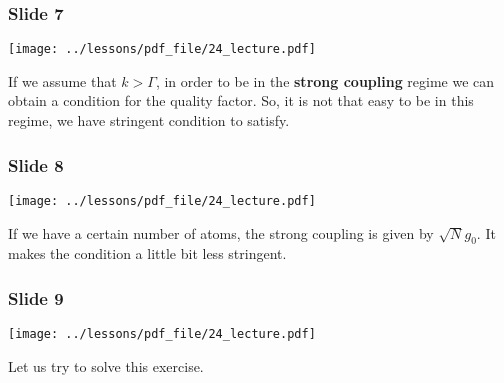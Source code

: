 \documentclass[../main/main.tex]{subfiles}
\begin{document}
\newpage

\subsubsection*{Slide 7}

\begin{minipage}[]{0.5\linewidth}
\centering
\texttt{[image: ../lessons/pdf\_file/24\_lecture.pdf]}
\end{minipage}
\hspace{0.3cm}\vspace{0.3cm}
\begin{minipage}[c]{0.47\linewidth}

If we assume that \( k > \Gamma  \), in order to be in the \textbf{strong coupling} regime we can obtain a condition for the quality factor. So, it is not that easy to be in this regime, we have stringent condition to satisfy.

\end{minipage}

\subsubsection*{Slide 8}

\begin{minipage}[]{0.5\linewidth}
\centering
\texttt{[image: ../lessons/pdf\_file/24\_lecture.pdf]}
\end{minipage}
\hspace{0.3cm}\vspace{0.3cm}
\begin{minipage}[c]{0.47\linewidth}

If we have a certain number of atoms, the strong coupling is given by \( \sqrt{N} g_0  \). It makes the condition a little bit less stringent.

\end{minipage}

\subsubsection*{Slide 9}

\begin{minipage}[]{0.5\linewidth}
\centering
\texttt{[image: ../lessons/pdf\_file/24\_lecture.pdf]}
\end{minipage}
\hspace{0.3cm}\vspace{0.3cm}
\begin{minipage}[c]{0.47\linewidth}

Let us try to solve this exercise.

\end{minipage}
\end{document}
